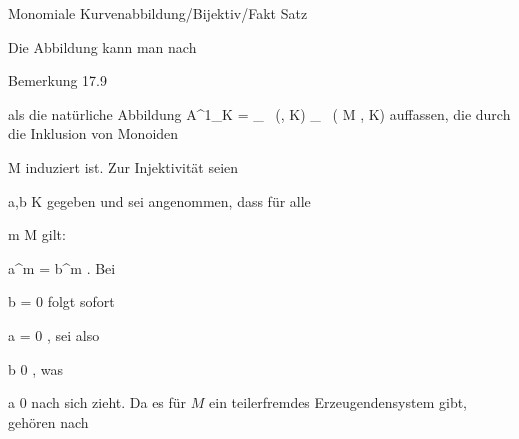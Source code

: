 {Monomiale Kurvenabbildung/Bijektiv/Fakt}
{Satz}
{}
{



\faktsituation {}
\faktzusatz {}
\faktzusatz {}





}
{





Die Abbildung kann man nach

Bemerkung 17.9

als die natürliche Abbildung
\maabbdisp {} { {\mathbb A}^{1}_{K} = _{  } \, (\N, K) } { _{  } \, ( M ,  K)
} {}
auffassen, die durch die Inklusion von Monoiden

\mavergleichskette
{\vergleichskette
{ M
}
{ \subseteq }{ \N
}
{  }{
}
{    }{
}
{   }{
}
}
{}{}{}
induziert ist. Zur Injektivität seien

\mavergleichskette
{\vergleichskette
{ a,b
}
{ \in }{ K
}
{  }{
}
{    }{
}
{   }{
}
}
{}{}{}
gegeben und sei angenommen, dass für alle

\mavergleichskette
{\vergleichskette
{ m
}
{ \in }{ M
}
{  }{
}
{    }{
}
{   }{
}
}
{}{}{}
gilt:

\mavergleichskette
{\vergleichskette
{ a^{m}
}
{ = }{ b^{m}
}
{  }{
}
{    }{
}
{   }{
}
}
{}{}{.}
Bei

\mavergleichskette
{\vergleichskette
{b
}
{ = }{ 0
}
{  }{
}
{    }{
}
{   }{
}
}
{}{}{}
folgt sofort

\mavergleichskette
{\vergleichskette
{a
}
{ = }{ 0
}
{  }{
}
{    }{
}
{   }{
}
}
{}{}{,}
sei also

\mavergleichskette
{\vergleichskette
{b
}
{ \neq }{ 0
}
{  }{
}
{    }{
}
{   }{
}
}
{}{}{,}
was

\mavergleichskette
{\vergleichskette
{a
}
{ \neq }{ 0
}
{  }{
}
{    }{
}
{   }{
}
}
{}{}{}
nach sich zieht. Da es für $M$ ein teilerfremdes Erzeugendensystem gibt, gehören nach

}

